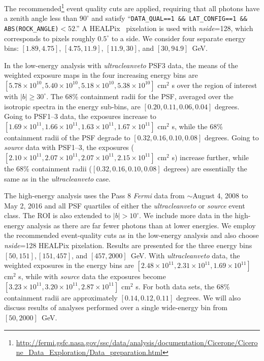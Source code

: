 The recommended\footnote{\url{http://fermi.gsfc.nasa.gov/ssc/data/analysis/documentation/Cicerone/Cicerone_Data_Exploration/Data_preparation.html}} event quality cuts are applied, requiring that all photons have a zenith angle less than $90^\circ$ and satisfy ``\texttt{DATA\_QUAL==1 \&\& LAT\_CONFIG==1 \&\& ABS(ROCK\_ANGLE)$ < 52$}.''   A HEALPix~\cite{Gorski:2004by} pixelation is used with \emph{nside}=128, which corresponds to pixels roughly $0.5^\circ$ to a side.   We consider four separate energy bins:  $[1.89, 4.75]$, $[4.75, 11.9]$, $[11.9, 30]$, and $[30, 94.9]$~GeV. 

In the low-energy analysis with {\it ultracleanveto} PSF3 data, the means of the weighted exposure maps in the four increasing energy bins are $[5.78 \times 10^{10}, 5.40 \times 10^{10}, 5.18 \times 10^{10}, 5.38 \times 10^{10}]$ cm$^2$ s over the region of interest with $|b| \geq 30^\circ$.  The 68\% containment radii for the PSF, averaged over the isotropic spectra in the energy sub-bins, are $[0.20, 0.11, 0.06, 0.04]$ degrees.  Going to PSF1--3 data, the exposures increase to $[1.69 \times 10^{11}, 1.66 \times 10^{11}, 1.63 \times 10^{11}, 1.67 \times 10^{11}]$ cm$^2$ s, while the 68\% containment radii of the PSF degrade to $[0.32, 0.16, 0.10, 0.08]$ degrees.  Going to {\it source} data with PSF1--3, the exposures ($[2.10 \times 10^{11}, 2.07 \times 10^{11}, 2.07 \times 10^{11},2.15 \times 10^{11}]$ cm$^2$ s) increase further, while the 68\% containment radii ($[0.32,0.16,0.10,0.08]$ degrees) are essentially the same as in the {\it ultracleanveto} case.

The high-energy analysis uses the Pass 8 \emph{Fermi} data from $\sim$August 4, 2008 to May 2, 2016 and all PSF quartiles of either the \emph{ultracleanveto} or \emph{source} event class.  The ROI is also extended to $|b| >10^\circ$.  We include more data in the high-energy analysis as there are far fewer photons than at lower energies.  We employ the recommended event-quality cuts as in the low-energy analysis and also choose \emph{nside}=128 HEALPix pixelation.  Results are presented for the three energy bins $[50, 151], [151, 457]$, and $[457, 2000]$~GeV.  With {\it ultracleanveto} data, the weighted exposures in the energy bins are $[2.48 \times 10^{11}, 2.31 \times 10^{11}, 1.69 \times 10^{11}]$ cm$^2$ s, while with {\it source} data the exposures become $[3.23 \times 10^{11}, 3.20 \times 10^{11}, 2.87 \times 10^{11}]$ cm$^2$ s.  For both data sets, the 68\% containment radii are approximately $[0.14, 0.12, 0.11]$ degrees.  We will also discuss results of analyses performed over a single wide-energy bin from $[50, 2000]$~GeV.  
 
